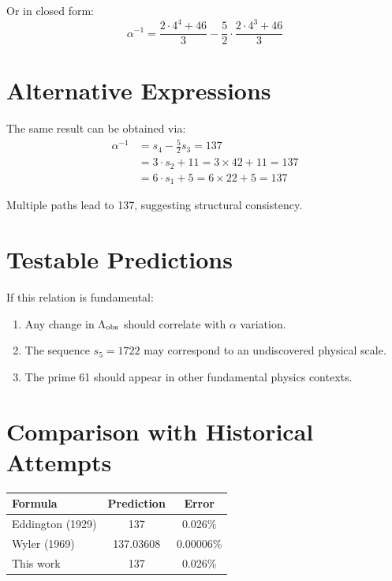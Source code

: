 \documentclass[twocolumn,prl,aps,superscriptaddress]{revtex4-2}
\begin{document}
Or in closed form:
\begin{equation}
\alpha^{-1} = \frac{2 \cdot 4^4 + 46}{3} - \frac{5}{2} \cdot \frac{2 \cdot 4^3 + 46}{3}
\end{equation}

\section{Alternative Expressions}

The same result can be obtained via:
\begin{align}
\alpha^{-1} &= s_4 - \frac{5}{2}s_3 = 137 \\
&= 3 \cdot s_2 + 11 = 3 \times 42 + 11 = 137 \\
&= 6 \cdot s_1 + 5 = 6 \times 22 + 5 = 137
\end{align}

Multiple paths lead to 137, suggesting structural consistency.

\section{Testable Predictions}

If this relation is fundamental:

\begin{enumerate}
\item Any change in $\Lambda_{\rm obs}$ should correlate with $\alpha$ variation.
\item The sequence $s_5 = 1722$ may correspond to an undiscovered physical scale.
\item The prime 61 should appear in other fundamental physics contexts.
\end{enumerate}

\section{Comparison with Historical Attempts}

\begin{table}[h]
\centering
\begin{tabular}{lcc}
\hline
Formula & Prediction & Error \\
\hline
Eddington (1929) & 137 & 0.026\% \\
Wyler (1969) & 137.03608 & 0.00006\% \\
This work & 137 & 0.026\% \\
\hline
\end{tabular}
\end{table}
\end{document}
